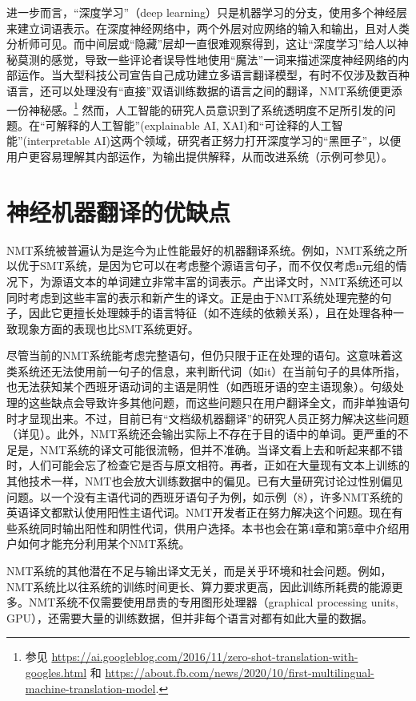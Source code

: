 \documentclass[output=paper]{langscibook}
\begin{document}
进一步而言，“深度学习”（deep learning）只是机器学习的分支，使用多个神经层来建立词语表示。在深度神经网络中，两个外层对应网络的输入和输出，且对人类分析师可见。而中间层或“隐藏”层却一直很难观察得到，这让“深度学习”给人以神秘莫测的感觉，导致一些评论者误导性地使用“魔法”一词来描述深度神经网络的内部运作。当大型科技公司宣告自己成功建立多语言翻译模型，有时不仅涉及数百种语言，还可以处理没有“直接”双语训练数据的语言之间的翻译，NMT系统便更添一份神秘感。\footnote{参见 \url{https://ai.googleblog.com/2016/11/zero-shot-translation-with-googles.html} 和 \url{https://about.fb.com/news/2020/10/first-multilingual-machine-translation-model}.} 然而，人工智能的研究人员意识到了系统透明度不足所引发的问题。在“可解释的人工智能”(explainable AI, XAI)和“可诠释的人工智能”(interpretable AI)这两个领域，研究者正努力打开深度学习的“黑匣子”，以便用户更容易理解其内部运作，为输出提供解释，从而改进系统（示例可参见\citet{Vashishth2019}）。



\section{神经机器翻译的优缺点}\label{sec:kenny:7}
NMT系统被普遍认为是迄今为止性能最好的机器翻译系统。例如，NMT系统之所以优于SMT系统，是因为它可以在考虑整个源语言句子，而不仅仅考虑n元组的情况下，为源语文本的单词建立非常丰富的词表示。产出译文时，NMT系统还可以同时考虑到这些丰富的表示和新产生的译文。正是由于NMT系统处理完整的句子，因此它更擅长处理棘手的语言特征（如不连续的依赖关系），且在处理各种一致现象方面的表现也比SMT系统更好。

尽管当前的NMT系统能考虑完整语句，但仍只限于正在处理的语句。这意味着这类系统还无法使用前一句子的信息，来判断代词（如it）在当前句子的具体所指，也无法获知某个西班牙语动词的主语是阴性（如西班牙语的空主语现象）。句级处理的这些缺点会导致许多其他问题，而这些问题只在用户翻译全文，而非单独语句时才显现出来。不过，目前已有“文档级机器翻译”的研究人员正努力解决这些问题（详见\citet{bao-etal-2021-g}）。此外，NMT系统还会输出实际上不存在于目的语中的单词。更严重的不足是，NMT系统的译文可能很流畅，但并不准确。当译文看上去和听起来都不错时，人们可能会忘了检查它是否与原文相符。再者，正如在大量现有文本上训练的其他技术一样，NMT也会放大训练数据中的偏见。已有大量研究讨论过性别偏见问题。以一个没有主语代词的西班牙语句子为例，如示例（8），许多NMT系统的英语译文都默认使用阳性主语代词。NMT开发者正在努力解决这个问题。现在有些系统同时输出阳性和阴性代词，供用户选择。本书也会在第4章和第5章中介绍用户如何才能充分利用某个NMT系统。

NMT系统的其他潜在不足与输出译文无关，而是关乎环境和社会问题。例如，NMT系统比以往系统的训练时间更长、算力要求更高，因此训练所耗费的能源更多。NMT系统不仅需要使用昂贵的专用图形处理器（graphical processing units, GPU），还需要大量的训练数据，但并非每个语言对都有如此大量的数据。
\end{document}
